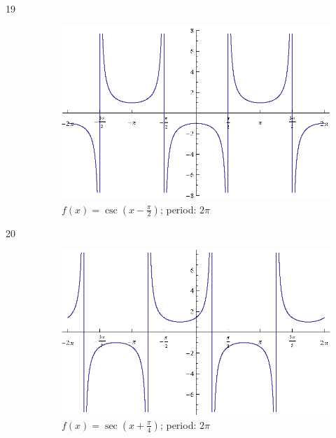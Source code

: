 \documentclass{exam}
\begin{document}
\begin{description}
      \item[19]
        \begin{figure}[H]
          \centering
          \includegraphics[scale=0.9]{exercise19.eps}
          \caption{$f(x) = \csc \left( x - \frac{\pi}{2} \right)$; period: $2 \pi$}
        \end{figure}

      \item[20]
        \begin{figure}[H]
          \centering
          \includegraphics[scale=0.9]{exercise20.eps}
          \caption{$f(x) = \sec \left( x + \frac{\pi}{4} \right)$; period: $2 \pi$}
        \end{figure}


\end{description}
\end{document}
